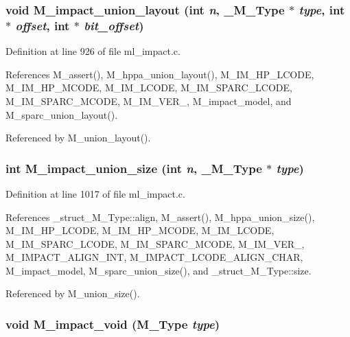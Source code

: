 \subsubsection{\setlength{\rightskip}{0pt plus 5cm}void M\_\-impact\_\-union\_\-layout (int {\em n}, \bf{\_\-M\_\-Type} $\ast$ {\em type}, int $\ast$ {\em offset}, int $\ast$ {\em bit\_\-offset})}\label{m__impact_8h_44a1330a8c7bc6a524a8499491e659fa}




Definition at line 926 of file ml\_\-impact.c.

References M\_\-assert(), M\_\-hppa\_\-union\_\-layout(), M\_\-IM\_\-HP\_\-LCODE, M\_\-IM\_\-HP\_\-MCODE, M\_\-IM\_\-LCODE, M\_\-IM\_\-SPARC\_\-LCODE, M\_\-IM\_\-SPARC\_\-MCODE, M\_\-IM\_\-VER\_, M\_\-impact\_\-model, and M\_\-sparc\_\-union\_\-layout().

Referenced by M\_\-union\_\-layout().
\subsubsection{\setlength{\rightskip}{0pt plus 5cm}int M\_\-impact\_\-union\_\-size (int {\em n}, \bf{\_\-M\_\-Type} $\ast$ {\em type})}\label{m__impact_8h_60162eb6fcc852b1e553033653d6e5a4}




Definition at line 1017 of file ml\_\-impact.c.

References \_\-struct\_\-M\_\-Type::align, M\_\-assert(), M\_\-hppa\_\-union\_\-size(), M\_\-IM\_\-HP\_\-LCODE, M\_\-IM\_\-HP\_\-MCODE, M\_\-IM\_\-LCODE, M\_\-IM\_\-SPARC\_\-LCODE, M\_\-IM\_\-SPARC\_\-MCODE, M\_\-IM\_\-VER\_, M\_\-IMPACT\_\-ALIGN\_\-INT, M\_\-IMPACT\_\-LCODE\_\-ALIGN\_\-CHAR, M\_\-impact\_\-model, M\_\-sparc\_\-union\_\-size(), and \_\-struct\_\-M\_\-Type::size.

Referenced by M\_\-union\_\-size().
\subsubsection{\setlength{\rightskip}{0pt plus 5cm}void M\_\-impact\_\-void (\bf{M\_\-Type} {\em type})}\label{m__impact_8h_c625ece0b7ac684355da7474aa4bfb5f}




